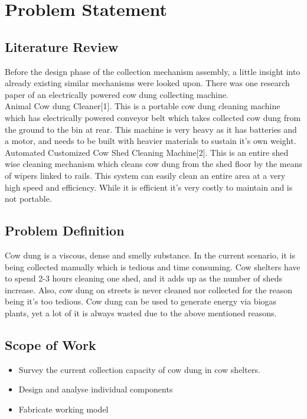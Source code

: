 \chapter{Problem Statement} \label{Problem Statement}
\section{Literature Review} \label{Literature Review}
Before the design phase of the collection mechanism assembly, a little insight into already existing similar mechanisms were looked upon. There was one research paper of an electrically powered cow dung collecting machine.\\
Animal Cow dung Cleaner[1]. This is a portable cow dung cleaning machine which has electrically powered conveyor belt which takes collected cow dung from the ground to the bin at rear. This machine is very heavy as it has batteries and a motor, and needs to be built with heavier materials to sustain it's own weight.\\
Automated Customized Cow Shed Cleaning Machine[2]. This is an entire shed wise cleaning mechanism which cleans cow dung from the shed floor by the means of wipers linked to rails. This system can easily clean an entire area at a very high speed and efficiency. While it is efficient it's very costly to maintain and is not portable.

\section{Problem Definition} \label{Problem Definition}
Cow dung is a viscous, dense and smelly substance. In the current scenario, it is being collected manually which is tedious and time consuming. Cow shelters have to spend 2-3 hours cleaning one shed, and it adds up as the number of sheds increase. Also, cow dung on streets is never cleaned nor collected for the reason being it’s too tedious. Cow dung can be used to generate energy via biogas plants, yet a lot of it is always wasted due to the above mentioned reasons.

\section{Scope of Work} \label{Scope of Work}

\begin{itemize}
    \item Survey the current collection capacity of cow dung in cow shelters.
    \item Design and analyse individual components
     \item Fabricate working model
\end{itemize}


